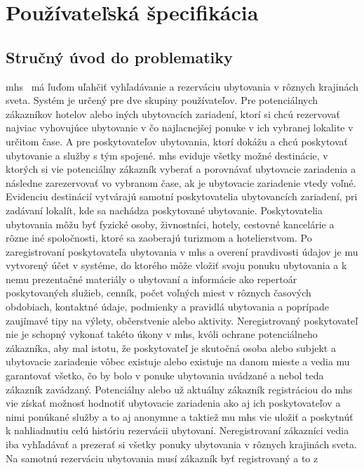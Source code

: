 \section{Používateľská špecifikácia} %
\subsection{Stručný úvod do problematiky}
\acrfull{mhs} \projectName\ má ľuďom uľahčiť vyhľadávanie a rezerváciu 
ubytovania v rôznych krajinách sveta.
Systém je určený pre dve skupiny používateľov. 
Pre potenciálnych zákazníkov hotelov alebo iných ubytovacích zariadení, 
ktorí si chcú rezervovať najviac vyhovujúce ubytovanie v čo najlacnejšej 
ponuke v ich vybranej lokalite v určitom čase. 
A pre poskytovateľov ubytovania, ktorí dokážu a chcú poskytovať ubytovanie 
a služby s tým spojené. 
\acrshort{mhs} eviduje všetky možné destinácie, v ktorých si vie 
potenciálny zákazník vyberať a porovnávať ubytovacie zariadenia a následne 
zarezervovať vo vybranom čase, ak je ubytovacie zariadenie vtedy voľné. 
Evidenciu destinácií vytvárajú samotní poskytovatelia ubytovancích zariadení, 
pri zadávaní lokalít, kde sa nachádza poskytované ubytovanie. 
Poskytovatelia ubytovania môžu byť fyzické osoby, živnostníci, hotely, 
cestovné kancelárie a rôzne iné spoločnosti, ktoré sa zaoberajú turizmom 
a hotelierstvom. 
Po zaregistrovaní poskytovateľa ubytovania v \acrshort{mhs} a overení 
pravdivosti údajov je mu vytvorený účet v systéme, do ktorého môže vložiť 
svoju ponuku ubytovania a k nemu prezentačné materiály o ubytovaní a 
informácie ako repertoár poskytovaných služieb, cenník, počet voľných 
miest v rôznych časových obdobiach, kontaktné údaje, podmienky a 
pravidlá ubytovania a poprípade zaujímavé tipy na výlety, občerstvenie 
alebo aktivity. Neregistrovaný poskytovateľ nie je schopný vykonať takéto 
úkony v \acrshort{mhs}, kvôli ochrane potenciálneho zákazníka, aby mal 
istotu, že poskytovateľ je skutočná osoba alebo subjekt a ubytovacie 
zariadenie vôbec existuje alebo existuje na danom mieste a vedia mu 
garantovať všetko, čo by bolo v ponuke ubytovania uvádzané a nebol teda 
zákazník zavádzaný. Potenciálny alebo už aktuálny zákazník registráciou 
do \acrshort{mhs} vie získať možnosť hodnotiť ubytovacie zariadenia ako 
aj ich poskytovateľov a nimi ponúkané služby a to aj anonymne a taktiež 
mu \acrshort{mhs} vie uložiť a poskytnúť k nahliadnutiu celú históriu 
rezervácii ubytovaní. Neregistrovaní zákazníci vedia iba vyhľadávať a 
prezerať si všetky ponuky ubytovania v rôznych krajinách sveta.
Na samotnú rezerváciu ubytovania musí zákazník byť registrovaný a to z 
